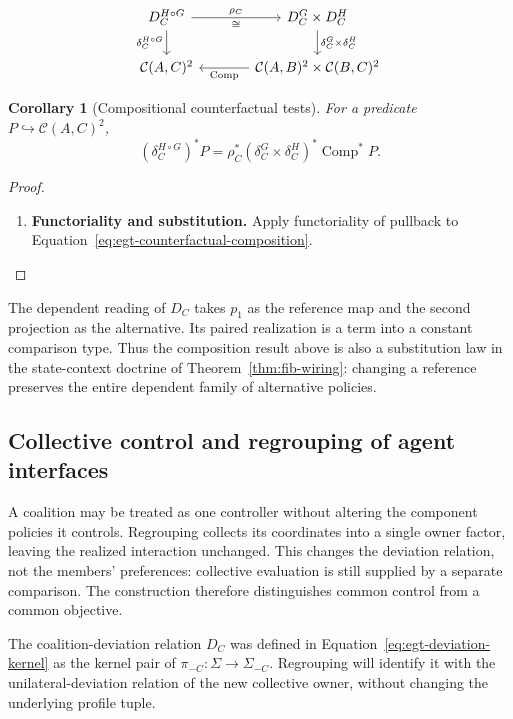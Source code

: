 \documentclass[11pt,a4paper]{article}
\numberwithin{equation}{section}
\newtheorem{corollary}[theorem]{Corollary}
\theoremstyle{definition}
\theoremstyle{remark}
\theoremstyle{plain}
\begin{document}
\[
\begin{tikzcd}[column sep=large]
 D_C^{H\circ G}\arrow[r,"\rho_C", "\cong"']
 \arrow[d,"\delta_C^{H\circ G}"']&D_C^G\times D_C^H
 \arrow[d,"\delta_C^G\times\delta_C^H"]\\
 \mathcal C(A,C)^2&\mathcal C(A,B)^2\times\mathcal C(B,C)^2
 \arrow[l,"\operatorname{Comp}"]
\end{tikzcd}
\]

\begin{corollary}[Compositional counterfactual tests]
For a predicate $P\hookrightarrow\mathcal C(A,C)^2$,
\[
 (\delta_C^{H\circ G})^*P
 =\rho_C^*(\delta_C^G\times\delta_C^H)^*\operatorname{Comp}^*P.
\]
\end{corollary}
\begin{proof}
\leavevmode
\begin{enumerate}[label=\textup{(\arabic*)},leftmargin=*,itemsep=4pt,topsep=3pt]
  \item \textbf{Functoriality and substitution.} Apply functoriality of pullback to
Equation~\eqref{eq:egt-counterfactual-composition}.
\end{enumerate}
\end{proof}

The dependent reading of $D_C$ takes $p_1$ as the reference map and
the second projection as the alternative. Its paired realization is a term into a
constant comparison type. Thus the composition result above is also a
substitution law in the state-context doctrine of
Theorem~\ref{thm:fib-wiring}: changing a reference preserves the entire
dependent family of alternative policies.

\subsection{Collective control and regrouping of agent interfaces}

A coalition may be treated as one controller without altering the
component policies it controls. Regrouping collects its coordinates into
a single owner factor, leaving the realized interaction unchanged.
This changes the deviation relation, not the members' preferences:
collective evaluation is still supplied by a separate comparison. The
construction therefore distinguishes common control from a common
objective.

The coalition-deviation relation $D_C$ was defined in
Equation~\eqref{eq:egt-deviation-kernel} as the kernel pair of
$\pi_{-C}:\Sigma\to\Sigma_{-C}$. Regrouping will identify it
with the unilateral-deviation relation of the new collective owner,
without changing the underlying profile tuple.
\end{document}
